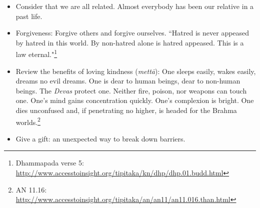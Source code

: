 \begin{itemize}
\item Consider that we are all related. Almost everybody has been our relative in a past life.

\item Forgiveness: Forgive others and forgive ourselves. ``Hatred is never appeased by hatred in this world. By non-hatred alone is hatred appeased. This is a law eternal."\footnote{Dhammapada verse 5: \url{http://www.accesstoinsight.org/tipitaka/kn/dhp/dhp.01.budd.html}}

\item Review the benefits of loving kindness (\textit{mettā}): One sleeps easily, wakes easily, dreams no evil dreams. One is dear to human beings, dear to non-human beings. The \textit{Devas} protect one. Neither fire, poison, nor weapons can touch one. One's mind gains concentration quickly. One's complexion is bright. One dies unconfused and, if penetrating no higher, is headed for the Brahma worlds.\footnote{AN 11.16: \url{http://www.accesstoinsight.org/tipitaka/an/an11/an11.016.than.html}}

\item Give a gift: an unexpected way to break down barriers.

\end{itemize}
